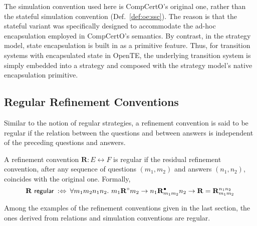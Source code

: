 
The simulation convention used here is CompCertO's original one,
rather than the stateful simulation convention (Def.~\ref{def:oe:ssc}).
The reason is that the stateful variant
was specifically designed to
accommodate the ad-hoc encapsulation
employed in CompCertO's semantics.
By contrast,
in the strategy model,
state encapsulation is built in as a primitive feature.
Thus, for transition systems with encapsulated state in OpenTE,
the underlying transition system is simply embedded
into a strategy and
composed with the strategy model's native encapsulation primitive.

\subsection{Regular Refinement Conventions}

Similar to the notion of regular strategies,
a refinement convention is said to be regular
if the relation between the questions and between answers
is independent of the preceding questions and answers.

\begin{definition}
  A refinement convention $\mathbf{R} : E \leftrightarrow F$
  is regular
  if the residual refinement convention,
  after any sequence of questions $(m_1, m_2)$
  and answers $(n_1, n_2)$,
  coincides with the original one.
  Formally,
  \[
    \mathbf{R}\  \mathsf{regular}  \::\Leftrightarrow\:
    \forall m_1 m_2 n_1 n_2.\
    m_1 \mathbf{R}^\circ m_2 \rightarrow
    n_1 \mathbf{R}^\bullet_{m_1m_2} n_2 \rightarrow
    \mathbf{R} = \mathbf{R}^{n_1n_2}_{m_1m_2}
  \]
\end{definition}
Among the examples of the refinement conventions
given in the last section,
the ones derived from relations and simulation conventions
are regular.

